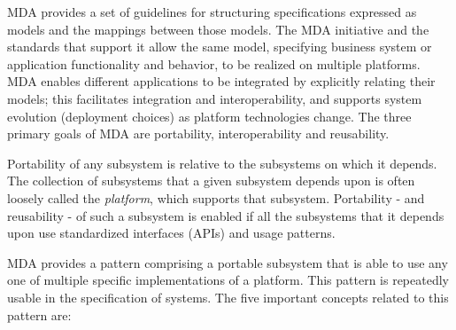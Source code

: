 MDA provides a set of guidelines for structuring specifications expressed as models and the mappings between those models. The MDA initiative and the standards that support it allow the same model, specifying business system or application functionality and behavior, to be realized on multiple platforms. MDA enables different applications to be integrated by explicitly relating their models; this facilitates integration and interoperability, and supports system evolution (deployment choices) as platform technologies change. The three primary goals of MDA are portability, interoperability and reusability.

Portability of any subsystem is relative to the subsystems on which it depends. The collection of subsystems that a given subsystem depends upon is often loosely called the \textit{platform}, which supports that subsystem. Portability - and reusability - of such a subsystem is enabled if all the subsystems that it depends upon use standardized interfaces (APIs) and usage patterns.

MDA provides a pattern comprising a portable subsystem that is able to use any one of multiple specific implementations of a platform. This pattern is repeatedly usable in the specification of systems. The five important concepts related to this pattern are:

